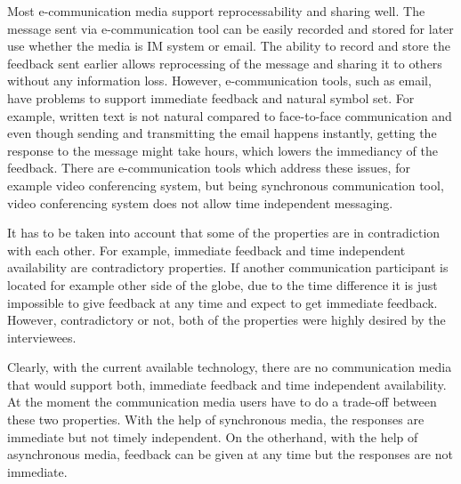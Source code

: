 \documentclass[english,12pt,a4paper,pdftex]{article}
\begin{document}
Most e-communication media support reprocessability and sharing well. The message sent via e-communication tool can be easily recorded and stored for later use whether the media is \ac{IM} system or email. The ability to record and store the feedback sent earlier allows reprocessing of the message and sharing it to others without any information loss. However, e-communication tools, such as email, have problems to support immediate feedback and natural symbol set. For example, written text is not natural compared to face-to-face communication and even though sending and transmitting the email happens instantly, getting the response to the message might take hours, which lowers the immediancy of the feedback. There are e-communication tools which address these issues, for example video conferencing system, but being synchronous communication tool, video conferencing system does not allow time independent messaging.

It has to be taken into account that some of the properties are in contradiction with each other. For example, immediate feedback and time independent availability are contradictory properties. If another communication participant is located for example other side of the globe, due to the time difference it is just impossible to give feedback at any time and expect to get immediate feedback. However, contradictory or not, both of the properties were highly desired by the interviewees.

Clearly, with the current available technology, there are no communication media that would support both, immediate feedback and time independent availability. At the moment the communication media users have to do a trade-off between these two properties. With the help of synchronous media, the responses are immediate but not timely independent. On the otherhand, with the help of asynchronous media, feedback can be given at any time but the responses are not immediate.

\end{document}
